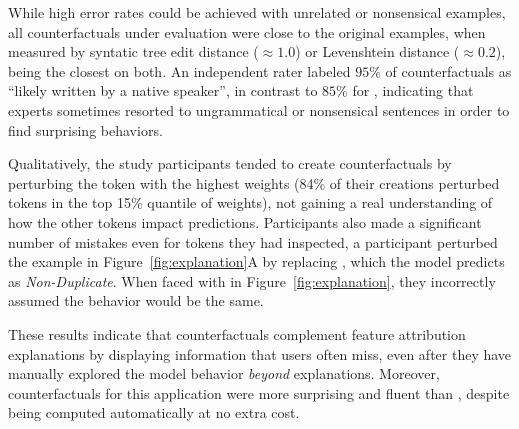While high error rates could be achieved with unrelated or nonsensical examples, all counterfactuals under evaluation were close to the original examples, when measured by syntatic tree edit distance (${\approx}1.0$) or Levenshtein distance (${\approx}0.2$), \cshap being the closest on both. An independent rater labeled $95\%$ of \cshap counterfactuals as ``likely written by a native speaker'', in contrast to $85\%$ for \chuman, indicating that experts sometimes resorted to ungrammatical or nonsensical sentences in order to find surprising behaviors.

Qualitatively, the study participants tended to create counterfactuals by perturbing the token with the highest weights (84\% of their creations perturbed tokens in the top 15\% quantile of weights), not gaining a real understanding of how the other tokens impact predictions. Participants also made a significant number of mistakes even for tokens they had inspected, \eg a participant perturbed the example in Figure~\ref{fig:explanation}A by replacing , which the model predicts as \emph{Non-Duplicate}. When faced with  in Figure~\ref{fig:explanation}, they incorrectly assumed the behavior would be the same.

These results indicate that \sysname{} counterfactuals complement feature attribution explanations by displaying information that users often miss, even after they have manually explored the model behavior \emph{beyond} explanations. Moreover, \sysname{} counterfactuals for this application were more surprising and fluent than \chuman, despite being computed automatically at no extra cost.



